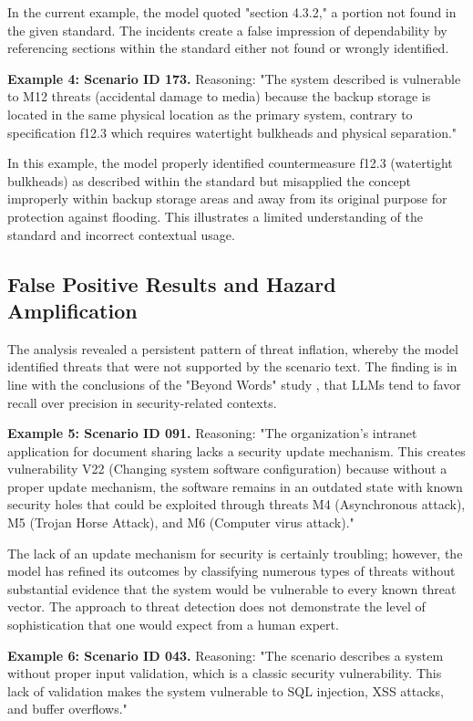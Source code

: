 \documentclass[sigconf]{acmart}
\begin{document}
In the current example, the model quoted "section 4.3.2," a portion not found in the given standard. The incidents create a false impression of dependability by referencing sections within the standard either not found or wrongly identified.

\textbf{Example 4: Scenario ID 173.} Reasoning: "The system described is vulnerable to M12 threats (accidental damage to media) because the backup storage is located in the same physical location as the primary system, contrary to specification f12.3 which requires watertight bulkheads and physical separation."

In this example, the model properly identified countermeasure f12.3 (watertight bulkheads) as described within the standard but misapplied the concept improperly within backup storage areas and away from its original purpose for protection against flooding. This illustrates a limited understanding of the standard and incorrect contextual usage.

\subsection{False Positive Results and Hazard Amplification}
The analysis revealed a persistent pattern of threat inflation, whereby the model identified threats that were not supported by the scenario text. The finding is in line with the conclusions of the "Beyond Words" study \citep{esposito2024beyond}, that LLMs tend to favor recall over precision in security-related contexts.

\textbf{Example 5: Scenario ID 091.} Reasoning: "The organization's intranet application for document sharing lacks a security update mechanism. This creates vulnerability V22 (Changing system software configuration) because without a proper update mechanism, the software remains in an outdated state with known security holes that could be exploited through threats M4 (Asynchronous attack), M5 (Trojan Horse Attack), and M6 (Computer virus attack)."

The lack of an update mechanism for security is certainly troubling; however, the model has refined its outcomes by classifying numerous types of threats without substantial evidence that the system would be vulnerable to every known threat vector. The approach to threat detection does not demonstrate the level of sophistication that one would expect from a human expert.

\textbf{Example 6: Scenario ID 043.} Reasoning: "The scenario describes a system without proper input validation, which is a classic security vulnerability. This lack of validation makes the system vulnerable to SQL injection, XSS attacks, and buffer overflows."
\end{document}
